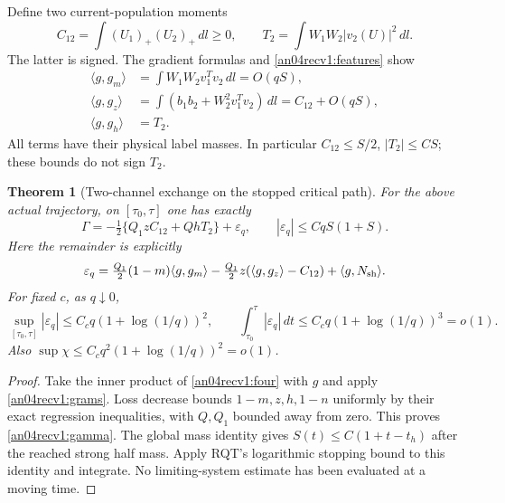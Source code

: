 \documentclass[11pt]{article}
\newtheorem{theorem}{Theorem}
\newcommand{\dd}{\,d}
\begin{document}
Define two current-population moments
\begin{equation}\label{an04recv1:moments}
 C_{12}=\int(U_1)_+(U_2)_+\dd l\ge0,\qquad
 T_2=\int W_1W_2|v_2(U)|^2\dd l.
\end{equation}
The latter is signed. The gradient formulas and
\eqref{an04recv1:features} show
\begin{align}
 \langle g,g_m\rangle
  &=\int W_1W_2v_1^Tv_2\dd l=O(qS),\nonumber\\
 \langle g,g_z\rangle
  &=\int(b_1b_2+W_2^2v_1^Tv_2)\dd l=C_{12}+O(qS),\nonumber\\
 \langle g,g_h\rangle&=T_2.\label{an04recv1:grams}
\end{align}
All terms have their physical label masses. In particular
$C_{12}\le S/2$, $|T_2|\le CS$; these bounds do not sign $T_2$.

\begin{theorem}[Two-channel exchange on the stopped critical path]
\label{an04recv1:reduction}
For the above actual trajectory, on $[\tau_0,\tau]$ one has exactly
\begin{equation}\label{an04recv1:gamma}
 \Gamma=-\tfrac12\{Q_1zC_{12}+QhT_2\}+\varepsilon_q,
 \qquad |\varepsilon_q|\le CqS(1+S).
\end{equation}
Here the remainder is explicitly
\[
 \varepsilon_q=\tfrac{Q_1}{2}(1-m)\langle g,g_m\rangle
 -\tfrac{Q_1}{2}z(\langle g,g_z\rangle-C_{12})
 +\langle g,N_{\rm sh}\rangle.
\]
For fixed $c$, as $q\downarrow0$,
\begin{equation}\label{an04recv1:budget}
 \sup_{[\tau_0,\tau]}|\varepsilon_q|
      \le C_c q(1+\log(1/q))^2,
 \qquad
 \int_{\tau_0}^{\tau}|\varepsilon_q|\dd t
      \le C_c q(1+\log(1/q))^3=o(1).
\end{equation}
Also $\sup\chi\le C_cq^2(1+\log(1/q))^2=o(1)$.
\end{theorem}
\begin{proof}
Take the inner product of \eqref{an04recv1:four} with $g$ and
apply \eqref{an04recv1:grams}. Loss decrease bounds $1-m,z,h,1-n$
uniformly by their exact regression inequalities, with $Q,Q_1$
bounded away from zero. This proves \eqref{an04recv1:gamma}.
The global mass identity gives $S(t)\le C(1+t-t_h)$ after the
reached strong half mass. Apply RQT's logarithmic stopping bound
to this identity and integrate. No limiting-system estimate has
been evaluated at a moving time.
\end{proof}
\end{document}
